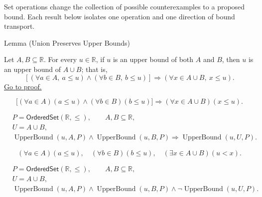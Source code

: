 \begin{remark*}[Orientation]
Set operations change the collection of possible counterexamples to a proposed
bound.  Each result below isolates one operation and one direction of bound
transport.
\end{remark*}

\begin{lemmabox}{Lemma (Union Preserves Upper Bounds)}
\begin{lemma}
\label{lem:union-preserves-upper-bounds}
Let $A,B\subseteq\mathbb{R}$. For every $u\in\mathbb{R}$, if $u$ is an
upper bound of both $A$ and $B$, then $u$ is an upper bound of
$A\cup B$; that is,
\[
\left[
(\forall a\in A,\ a\leq u)
\land
(\forall b\in B,\ b\leq u)
\right]
\Longrightarrow
(\forall x\in A\cup B,\ x\leq u).
\]
\hyperref[prf:union-preserves-upper-bounds]{Go to proof.}
\end{lemma}
\end{lemmabox}

\begin{remark*}
\[
\bigl[(\forall a\in A)(a\leq u)\land(\forall b\in B)(b\leq u)\bigr]
\Longrightarrow
(\forall x\in A\cup B)(x\leq u).
\]
\end{remark*}

\begin{remark*}
\[
\begin{aligned}
&P=\mathsf{OrderedSet}(\mathbb{R},\leq),\qquad A,B\subseteq\mathbb{R},\\
&U=A\cup B,\\
&\operatorname{UpperBound}(u,A,P)\land\operatorname{UpperBound}(u,B,P)
\Longrightarrow \operatorname{UpperBound}(u,U,P).
\end{aligned}
\]
\end{remark*}

\begin{remark*}
\[
(\forall a\in A)(a\leq u),\quad
(\forall b\in B)(b\leq u),\quad
(\exists x\in A\cup B)(u<x).
\]
\end{remark*}

\begin{remark*}
\[
\begin{aligned}
&P=\mathsf{OrderedSet}(\mathbb{R},\leq),\qquad A,B\subseteq\mathbb{R},\\
&U=A\cup B,\\
&\operatorname{UpperBound}(u,A,P)\land\operatorname{UpperBound}(u,B,P)\land
\neg\operatorname{UpperBound}(u,U,P).
\end{aligned}
\]
\end{remark*}

